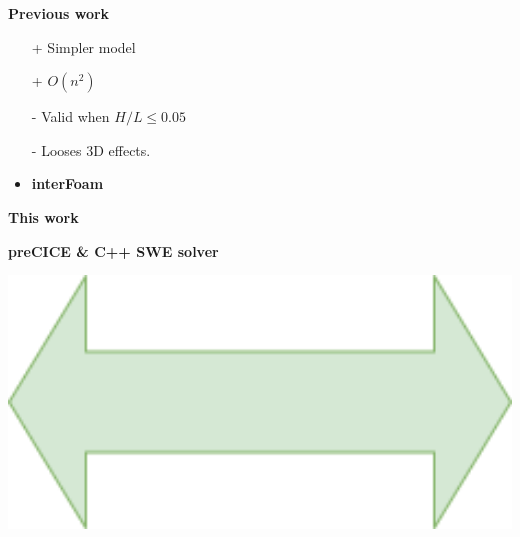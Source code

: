 \begin{frame}
{\Large \textbf{Previous work \cite{mintgen}}}\\[0.5cm]
\hspace{1cm}
\begin{minipage}{0.35\textwidth}
\begin{tcolorbox}[
colframe=TUMDarkestBlue,
colback=TUMDarkBlue!50,
title = \centering SWE\\2D] 
\begin{itemize}
\item[+] Simpler model 
\item[+] $O(n^2)$
\item[-] Valid when $H/L \leq 0.05$ %
\item[-] Looses 3D effects. \vspace{0.5cm}
\item \large \textbf{interFoam}
\end{itemize}
\end{tcolorbox}    
\vspace{1cm}
\hspace{-1cm}
{\Large \textbf{This work}}
\vspace{0.3cm}
\begin{tcolorbox}[
colframe=TUMDarkBlue,
colback=TUMDarkBlue!50] 
{\large \textbf{preCICE \& C++ SWE solver}}
\end{tcolorbox}  
\end{minipage}
\begin{minipage}{0.15\textwidth}
\hspace{0.5cm}
\vspace{3.5cm}
\includegraphics[width=1\textwidth]{Resources/Images/arrow2.png}\\

\end{minipage}
\end{frame}
